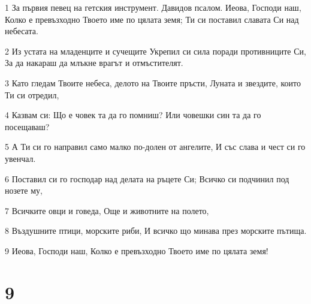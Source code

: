 \par 1 За първия певец на гетския инструмент. Давидов псалом. Иеова, Господи наш, Колко е превъзходно Твоето име по цялата земя; Ти си поставил славата Си над небесата.
\par 2 Из устата на младенците и сучещите Укрепил си сила поради противниците Си, За да накараш да млъкне врагът и отмъстителят.
\par 3 Като гледам Твоите небеса, делото на Твоите пръсти, Луната и звездите, които Ти си отредил,
\par 4 Казвам си: Що е човек та да го помниш? Или човешки син та да го посещаваш?
\par 5 А Ти си го направил само малко по-долен от ангелите, И със слава и чест си го увенчал.
\par 6 Поставил си го господар над делата на ръцете Си; Всичко си подчинил под нозете му,
\par 7 Всичките овци и говеда, Още и животните на полето,
\par 8 Въздушните птици, морските риби, И всичко що минава през морските пътища.
\par 9 Иеова, Господи наш, Колко е превъзходно Твоето име по цялата земя!

\chapter{9}

